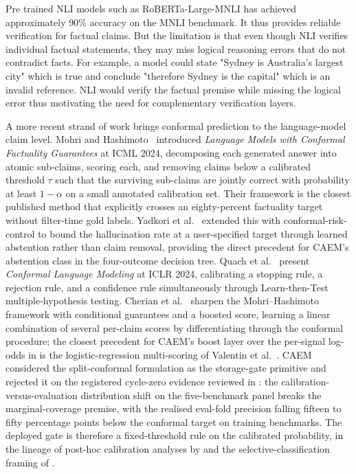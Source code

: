 Pre trained NLI models such as RoBERTa-Large-MNLI has achieved approximately 90\% accuracy on the MNLI benchmark. It thus provides reliable verification for factual claims. But the limitation is that even though NLI verifies individual factual statements, they may miss logical reasoning errors that do not contradict facts. For example, a model could state "Sydney is Australia's largest city" which is true and conclude "therefore Sydney is the capital" which is an invalid reference. NLI would verify the factual premise while missing the logical error thus motivating the need for complementary verification layers.

A more recent strand of work brings conformal prediction to the language-model claim level. Mohri and Hashimoto~\cite{mohri2024conformal} introduced \emph{Language Models with Conformal Factuality Guarantees} at ICML 2024, decomposing each generated answer into atomic sub-claims, scoring each, and removing claims below a calibrated threshold $\tau$ such that the surviving sub-claims are jointly correct with probability at least $1-\alpha$ on a small annotated calibration set. Their framework is the closest published method that explicitly crosses an eighty-percent factuality target without filter-time gold labels. Yadkori et al.~\cite{yadkori2024abstention} extended this with conformal-risk-control to bound the hallucination rate at a user-specified target through learned abstention rather than claim removal, providing the direct precedent for CAEM's abstention class in the four-outcome decision tree. Quach et al.~\cite{quach2024conformal} present \emph{Conformal Language Modeling} at ICLR 2024, calibrating a stopping rule, a rejection rule, and a confidence rule simultaneously through Learn-then-Test multiple-hypothesis testing. Cherian et al.~\cite{cherian2024conformal} sharpen the Mohri--Hashimoto framework with conditional guarantees and a boosted score, learning a linear combination of several per-claim scores by differentiating through the conformal procedure; the closest precedent for CAEM's boost layer over the per-signal log-odds in  is the logistic-regression multi-scoring of Valentin et al.~\cite{valentin2024hallucination}. CAEM considered the split-conformal formulation as the storage-gate primitive and rejected it on the registered cycle-zero evidence reviewed in : the calibration-versus-evaluation distribution shift on the five-benchmark panel breaks the marginal-coverage premise, with the realised eval-fold precision falling fifteen to fifty percentage points below the conformal target on training benchmarks. The deployed gate is therefore a fixed-threshold rule on the calibrated probability, in the lineage of post-hoc calibration analyses by \cite{niculescu2005predicting} and the selective-classification framing of \cite{geifman2017selective}.

